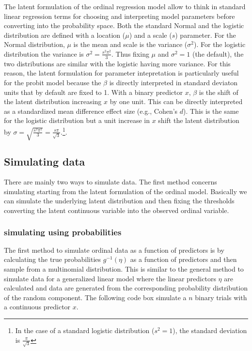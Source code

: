 \documentclass[
  man,floatsintext]{apa6}
\begin{document}
The latent formulation of the ordinal regression model allow to think in standard linear regression terms for choosing and interpreting model parameters before converting into the probability space. Both the standard Normal and the logistic distribution are defined with a location (\(\mu\)) and a scale (\(s\)) parameter. For the Normal distribution, \(\mu\) is the mean and scale is the variance (\(\sigma^2\)). For the logistic distribution the variance is \(\sigma^2=\frac{s^2\pi^2}{3}\). Thus fixing \(\mu\) and \(\sigma^2 = 1\) (the default), the two distributions are similar with the logistic having more variance. For this reason, the latent formulation for parameter intepretation is particularly useful for the probit model because the \(\beta\) is directly interpreted in standard deviaton units that by default are fixed to 1. With a binary predictor \(x\), \(\beta\) is the shift of the latent distribution increasing \(x\) by one unit. This can be directly interpreted as a standardized mean difference effect size (e.g., Cohen's \(d\)). This is the same for the logistic distribution but a unit increase in \(x\) shift the latent distribution by \(\sigma = \sqrt{\frac{s^2 \pi^2}{3}} = \frac{s\pi}{\sqrt{3}}\).\footnote{In the case of a standard logistic distribution (\(s^2 = 1\)), the standard deviation is \(\frac{\pi}{\sqrt{3}}\)}.

\subsection{Simulating data}\label{simulating-data}

There are mainly two ways to simulate data. The first method concerns simulating starting from the latent formulation of the ordinal model. Basically we can simulate the underlying latent distribution and then fixing the thresholds converting the latent continuous variable into the observed ordinal variable.

\subsubsection{simulating using probabilities}\label{simulating-using-probabilities}

The first method to simulate ordinal data as a function of predictors is by calculating the true probabilities \(g^{-1}(\eta)\) as a function of predictors and then sample from a multinomial distribution. This is similar to the general method to simulate data for a generalized linear model where the linear predictors \(\eta\) are calculated and data are generated from the corresponding probability distribution of the random component. The following code box simulate a \(n\) binary trials with a continuous predictor \(x\).
\end{document}
